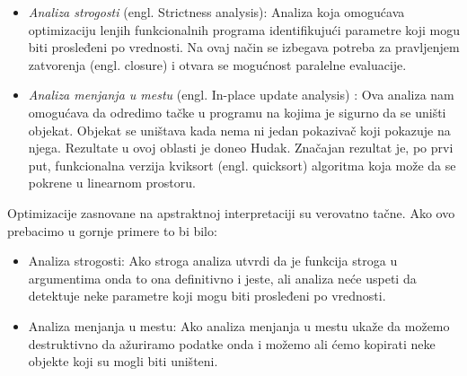 \begin{itemize}
\item \textit{Analiza strogosti} (engl. Strictness analysis\cite{AbramskyHankin}):
Analiza koja omogućava optimizaciju lenjih funkcionalnih programa identifikujući parametre koji mogu biti prosleđeni po vrednosti. Na ovaj način se izbegava potreba za pravljenjem zatvorenja (engl. closure) i otvara se mogućnost paralelne evaluacije. 

\item \textit{Analiza menjanja u mestu} (engl. In-place update analysis) \cite{CannPhd}:
Ova analiza nam omogućava da odredimo tačke u programu na kojima je sigurno da se uništi objekat. Objekat se uništava kada nema ni jedan pokazivač koji pokazuje na njega. Rezultate u ovoj oblasti je doneo Hudak. Značajan rezultat je, po prvi put, funkcionalna verzija kviksort (engl. quicksort) algoritma koja može da se pokrene u linearnom prostoru. \cite{Girard1987}



\end{itemize}
Optimizacije zasnovane na apstraktnoj interpretaciji su verovatno tačne. Ako ovo prebacimo u gornje primere to bi bilo:

\begin{itemize}
\item Analiza strogosti:
Ako stroga analiza utvrdi da je funkcija stroga u argumentima onda to ona definitivno i jeste, ali analiza neće uspeti da detektuje neke parametre koji mogu biti prosleđeni po vrednosti. 

\item Analiza menjanja u mestu:
Ako analiza menjanja u mestu ukaže da možemo destruktivno da ažuriramo podatke onda i možemo ali ćemo kopirati neke objekte koji su mogli biti uništeni. \cite{Girard1987}



\end{itemize}

